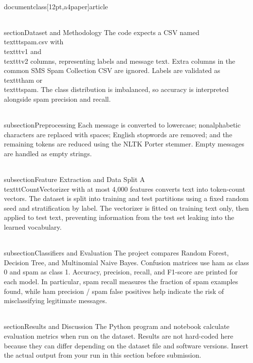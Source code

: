 \\documentclass[12pt,a4paper]{article}
\begin{document}
\\section{Dataset and Methodology}
The code expects a CSV named \\texttt{spam.csv} with \\texttt{v1} and \\texttt{v2} columns, representing labels and message text. Extra columns in the common SMS Spam Collection CSV are ignored. Labels are validated as \\texttt{ham} or \\texttt{spam}. The class distribution is imbalanced, so accuracy is interpreted alongside spam precision and recall.

\\subsection{Preprocessing}
Each message is converted to lowercase; nonalphabetic characters are replaced with spaces; English stopwords are removed; and the remaining tokens are reduced using the NLTK Porter stemmer. Empty messages are handled as empty strings.

\\subsection{Feature Extraction and Data Split}
A \\texttt{CountVectorizer} with at most 4,000 features converts text into token-count vectors. The dataset is split into training and test partitions using a fixed random seed and stratification by label. The vectorizer is fitted on training text only, then applied to test text, preventing information from the test set leaking into the learned vocabulary.

\\subsection{Classifiers and Evaluation}
The project compares Random Forest, Decision Tree, and Multinomial Naive Bayes. Confusion matrices use ham as class 0 and spam as class 1. Accuracy, precision, recall, and F1-score are printed for each model. In particular, spam recall measures the fraction of spam examples found, while ham precision / spam false positives help indicate the risk of misclassifying legitimate messages.

\\section{Results and Discussion}
The Python program and notebook calculate evaluation metrics when run on the dataset. Results are not hard-coded here because they can differ depending on the dataset file and software versions. Insert the actual output from your run in this section before submission.
\end{document}

